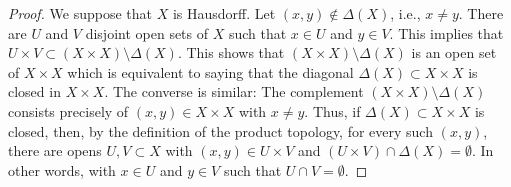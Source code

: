 \documentclass[10pt,a4paper]{amsart}
\theoremstyle{plain}
\theoremstyle{definition}
\theoremstyle{remark}
\numberwithin{equation}{subsection}
\begin{document}
\begin{proof}
We suppose that $X$ is Hausdorff. Let $(x, y) \not \in \Delta(X)$, i.e.,
$x \neq y$. There are $U$ and $V$ disjoint open sets of $X$
such that $x \in U$ and $y \in V$. This implies that $U \times V \subset
(X \times X) \setminus \Delta(X) $. This shows that $ (X \times X) \setminus
\Delta(X)$ is an open set of $ X \times X$ which is equivalent to saying that
the diagonal $\Delta(X) \subset X \times X$ is closed in $X \times X$.
The converse is similar:
The complement $(X \times X) \setminus \Delta(X)$ consists
precisely of $(x, y) \in X\times X$ with $ x \neq y$. Thus, if $ \Delta(X)
\subset X \times X$ is closed, then, by the definition of the product topology,
for every such $ (x, y)$, there are opens $U, V \subset X$ with $(x, y) \in
U \times V$ and $(U \times V)\cap \Delta(X) = \emptyset$. In other words, with
$x \in U$ and $y \in V$ such that $U \cap V = \emptyset$.
\end{proof}
\end{document}
